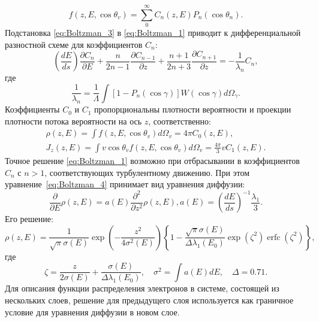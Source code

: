 \begin{equation} \label{eq:Boltzman_3}
	f\left(z, E, \cos \theta_v\right)=\sum_0^{\infty} C_n(z, E) P_n\left(\cos \theta_n\right).
\end{equation}
Подстановка \ref{eq:Boltzman_3} в \ref{eq:Boltzman_1} приводит к дифференциальной разностной схеме для коэффициентов $C_n$:
\begin{equation} \label{eq:Boltzman_4}
	\left(\frac{d E}{d s}\right) \frac{\partial C_n}{\partial E}+\frac{n}{2 n-1} \frac{\partial C_{n-1}}{\partial z}+\frac{n+1}{2 n+3} \frac{\partial C_{n+1}}{\partial z}=-\frac{1}{\lambda_n} C_n,
\end{equation}
где
\begin{equation} \label{eq:Boltzman_5}
	\frac{1}{\lambda_n}=\frac{1}{\Lambda} \int\left[1-P_n(\cos \gamma)\right] W(\cos \gamma) d \Omega_\gamma.
\end{equation}
Коэффициенты $C_0$ и $C_1$ пропорциональны плотности вероятности и проекции плотности потока вероятности на ось $z$, соответственно:
\begin{equation} \label{eq:Boltzman_6}
	\begin{gathered}
		\rho(z, E)=\int f\left(z, E, \cos \theta_v\right) d \Omega_v=4 \pi C_0(z, E), \\
		J_z(z, E)=\int v \cos \theta_v f\left(z, E, \cos \theta_v\right) d \Omega_v=\frac{4 \pi}{3} v C_1(z, E).
	\end{gathered}
\end{equation}
Точное решение \ref{eq:Boltzman_1} возможно при отбрасывании в  коэффициентов $C_n$ с \break $n>1$, соответствующих турбулентному движению. При этом уравнение~\ref{eq:Boltzman_4} принимает вид уравнения диффузии:
\begin{equation} \label{eq:Boltzman_7}
	\frac{\partial}{\partial E} \rho(z, E)=a(E) \frac{\partial^2}{\partial z^2} \rho(z, E), a(E)=\left(\frac{d E}{d s}\right)^{-1} \frac{\lambda_1}{3}.
\end{equation}
Его решение:
\begin{equation} \label{eq:Boltzman_8}
	\rho(z, E)=\frac{1}{\sqrt{\pi} \sigma(E)} \exp \left(-\frac{z^2}{4 \sigma^2(E)}\right)\left\{1-\frac{\sqrt{\pi} \sigma(E)}{\Delta \lambda_1\left(E_0\right)} \exp \left(\zeta^2\right) \operatorname{erfc}\left(\zeta^2\right)\right\},
\end{equation}
где
\begin{equation} \label{eq:Boltzman_9}
	\zeta = \frac{z}{2 \sigma(E)}+\frac{\sigma(E)}{\Delta \lambda_1\left(E_0\right)}, \quad \sigma^2=\int a(E) d E, \quad \Delta=0.71.
\end{equation}
Для описания функции распределения электронов в системе, состоящей из нескольких слоев, решение для предыдущего слоя используется как граничное условие для уравнения диффузии в новом слое.


